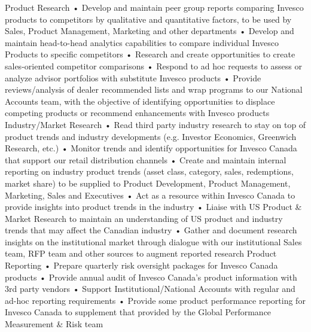 \documentclass[footinclude, headinclude, letterpaper]{scrartcl}
\begin{document}
\begin{cv}{}

\begin{mycomments}
 Product Research
•	Develop and maintain peer group reports comparing Invesco products to competitors by qualitative and quantitative factors, to be used by Sales, Product Management, Marketing and other departments
•	Develop and maintain head-to-head analytics capabilities to compare individual Invesco Products to specific competitors
•	Research and create opportunities to create sales-oriented competitor comparisons
•	Respond to ad hoc requests to assess or analyze advisor portfolios with substitute Invesco products
•	Provide reviews/analysis of dealer recommended lists and wrap programs to our National Accounts team, with the objective of identifying opportunities to displace competing products or recommend enhancements with Invesco products
Industry/Market Research
•	Read third party industry research to stay on top of product trends and industry developments (e.g. Investor Economics, Greenwich Research, etc.)
•	Monitor trends and identify opportunities for Invesco Canada that support our retail  distribution channels
•	Create and maintain internal reporting on industry product trends (asset class, category, sales, redemptions, market share) to be supplied to Product Development, Product Management, Marketing, Sales and Executives
•	Act as a resource within Invesco Canada to provide insights into product trends in the industry
•	Liaise with US Product & Market Research to maintain an understanding of US product and industry trends that may affect the Canadian industry
•	Gather and document research insights on the institutional market through dialogue with our institutional Sales team, RFP team and other sources to augment reported research
Product Reporting 
•	Prepare quarterly risk oversight packages for Invesco Canada products
•	Provide annual audit of Invesco Canada’s product information with 3rd party vendors
•	Support Institutional/National Accounts with regular and ad-hoc reporting requirements
•	Provide some product performance reporting for Invesco Canada to supplement that provided by the Global Performance Measurement & Risk team
\end{mycomments}



\end{cv}
\end{document}
